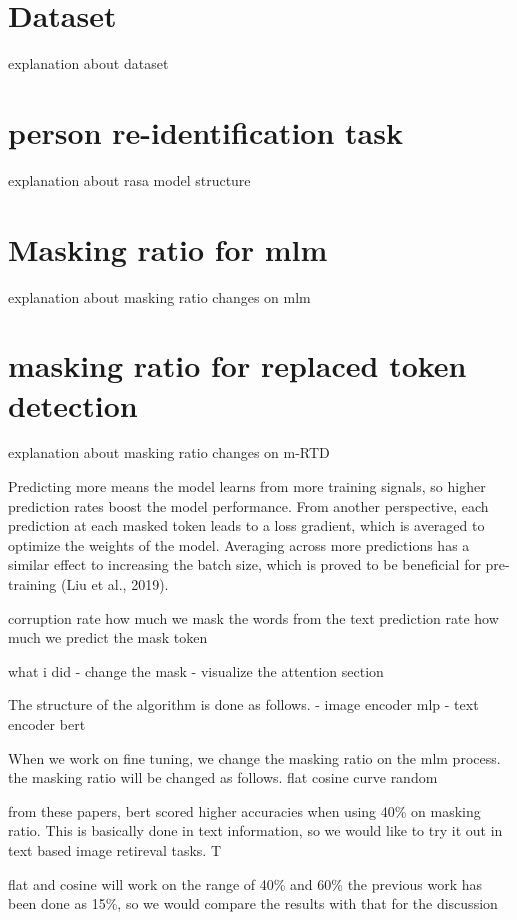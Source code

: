 \section{Dataset}
explanation about dataset

\section{person re-identification task}
explanation about rasa model structure

\section{Masking ratio for mlm}
explanation about masking ratio changes on mlm

\section{masking ratio for replaced token detection}
explanation about masking ratio changes on m-RTD





Predicting more means the model learns from more training signals, so higher prediction rates boost the model performance. From another perspective, each prediction at each masked token leads to a loss gradient, which is averaged to optimize the weights of the model. Averaging across more predictions has a similar effect to increasing the batch size, which is proved to be beneficial for pre-training (Liu et al., 2019). 


corruption rate how much we mask the words from the text
prediction rate how much we predict the mask token 


what i did 
- change the mask 
- visualize the attention section

The structure of the algorithm is done as follows. 
- image encoder
  mlp 
- text encoder
  bert 

When we work on fine tuning, we change the masking ratio on the mlm process. 
the masking ratio will be changed as follows.
flat 
cosine curve 
random 

from these papers, bert scored higher accuracies when using 40\% on masking ratio. This is basically done in text information, 
so we would like to try it out in text based image retireval tasks. T

flat and cosine will work on the range of 40\% and 60\% 
the previous work has been done as 15\%, so we would compare the results with that for the discussion 

